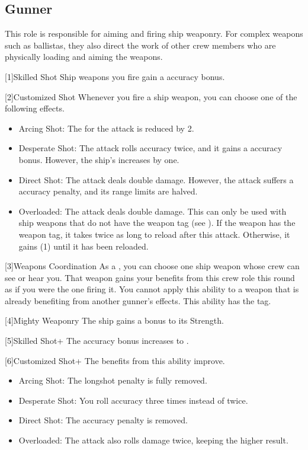     \subsection{Gunner}
        This role is responsible for aiming and firing ship weaponry.
        For complex weapons such as ballistas, they also direct the work of other crew members who are physically loading and aiming the weapons.

        [1]{Skilled Shot} Ship weapons you fire gain a  accuracy bonus.

        [2]{Customized Shot} Whenever you fire a ship weapon, you can choose one of the following effects.
        \begin{itemize}
            \item Arcing Shot: The  for the attack is reduced by 2.
            \item Desperate Shot: The attack rolls accuracy twice, and it gains a  accuracy bonus.
                However, the ship's  increases by one.
            \item Direct Shot: The attack deals double damage.
                However, the attack suffers a  accuracy penalty, and its range limits are halved.
            \item Overloaded: The attack deals double damage.
                This can only be used with ship weapons that do not have the  weapon tag (see ).
                If the weapon has the  weapon tag, it takes twice as long to reload after this attack.
                Otherwise, it gains  (1) until it has been reloaded.
        \end{itemize}

        [3]{Weapons Coordination} As a , you can choose one ship weapon whose crew can see or hear you.
        That weapon gains your benefits from this crew role this round as if you were the one firing it.
        You cannot apply this ability to a weapon that is already benefiting from another gunner's effects.
        This ability has the  tag.

        [4]{Mighty Weaponry} The ship gains a  bonus to its Strength.

        [5]{Skilled Shot+} The accuracy bonus increases to .

        [6]{Customized Shot+} The benefits from this ability improve.
        \begin{itemize}
            \item Arcing Shot: The longshot penalty is fully removed.
            \item Desperate Shot: You roll accuracy three times instead of twice.
            \item Direct Shot: The accuracy penalty is removed.
            \item Overloaded: The attack also rolls damage twice, keeping the higher result.
        \end{itemize}

